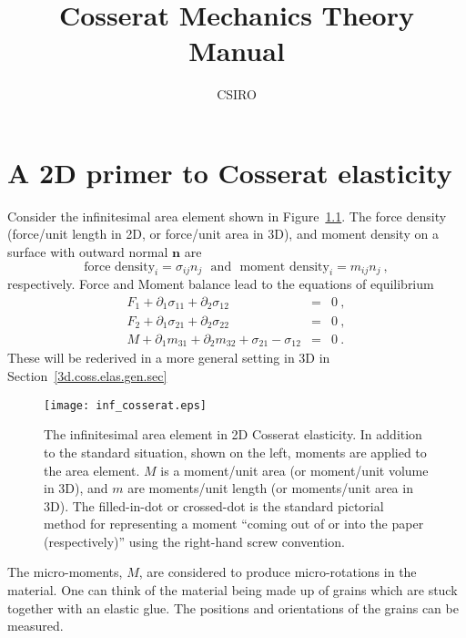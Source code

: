 \documentclass[]{scrreprt}
\newcommand{\si}{\sigma}
\newcommand{\mand}{\ \ \ \mbox{and}\ \ \ }
\newcommand{\pl}{\partial}
\begin{document}
\title{Cosserat Mechanics Theory Manual}
\author{CSIRO}
\maketitle

\tableofcontents

\chapter{A 2D primer to Cosserat elasticity}

Consider the infinitesimal area element shown in
Figure~\ref{inf_cosserat.fig}.  The force density (force/unit length
in 2D, or force/unit area in 3D), and moment density on a surface with
outward normal ${\mathbf n}$ are
$$
\mbox{force density}_{i} = \si_{ij}n_{j} \mand
\mbox{moment density}_{i} = m_{ij}n_{j} \ ,
$$
respectively.  Force and Moment balance lead to the
equations of equilibrium
\begin{eqnarray*}
F_{1} + \pl_{1}\si_{11} + \pl_{2}\si_{12} & = & 0 \ ,\\
F_{2} + \pl_{1}\si_{21} + \pl_{2}\si_{22} & = & 0 \ ,\\
M + \pl_{1}m_{31} + \pl_{2}m_{32} + \si_{21}-\si_{12} & = & 0 \ .
\end{eqnarray*}
These will be rederived in a more general setting in 3D in Section~\ref{3d.coss.elas.gen.sec}

\begin{figure}[htb]
\begin{center}
\texttt{[image: inf\_cosserat.eps]}
\caption{The infinitesimal area element in 2D Cosserat elasticity.
  In addition to the standard situation, shown on the left, moments
  are applied to the area element.  $M$ is a moment/unit area (or
  moment/unit volume in 3D), and $m$ are moments/unit length (or
  moments/unit area in 3D).  The filled-in-dot or crossed-dot
  is the standard pictorial method for representing a moment ``coming
  out of or into the paper (respectively)'' using the right-hand screw
  convention.}
\label{inf_cosserat.fig}
\end{center}
\end{figure}

The micro-moments, $M$, are considered to produce micro-rotations in
the material.  One can think of the material being made up of grains
which are stuck together with an elastic glue.  The positions and
orientations of the grains can be measured.
\end{document}

